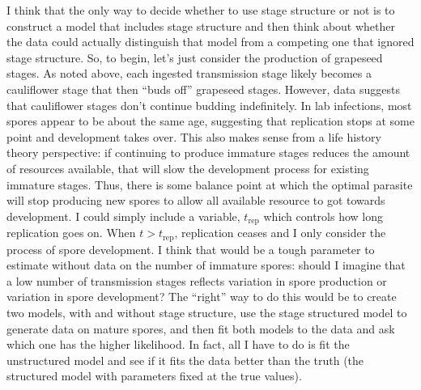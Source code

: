 \documentclass[12pt,reqno,final,pdftex]{amsart}\usepackage[]{graphicx}\usepackage[]{color}
\theoremstyle{plain}
\numberwithin{equation}{part}
\begin{document}
I think that the only way to decide whether to use stage structure or not is to construct a model that includes stage structure and then think about whether the data could actually distinguish that model from a competing one that ignored stage structure.
So, to begin, let's just consider the production of grapeseed stages.
As noted above, each ingested transmission stage likely becomes a cauliflower stage that then ``buds off'' grapeseed stages.
However, data suggests that cauliflower stages don't continue budding indefinitely.
In lab infections, most spores appear to be about the same age, suggesting that replication stops at some point and development takes over.
This also makes sense from a life history theory perspective: if continuing to produce immature stages reduces the amount of resources available, that will slow the development process for existing immature stages.
Thus, there is some balance point at which the optimal parasite will stop producing new spores to allow all available resource to got towards development.
I could simply include a variable, $t_{\text{rep}}$ which controls how long replication goes on.
When $t > t_{\text{rep}}$, replication ceases and I only consider the process of spore development.
I think that would be a tough parameter to estimate without data on the number of immature spores: should I imagine that a low number of transmission stages reflects variation in spore production or variation in spore development?
The ``right'' way to do this would be to create two models, with and without stage structure, use the stage structured model to generate data on mature spores, and then fit both models to the data and ask which one has the higher likelihood.
In fact, all I have to do is fit the unstructured model and see if it fits the data better than the truth (the structured model with parameters fixed at the true values).
\end{document}
